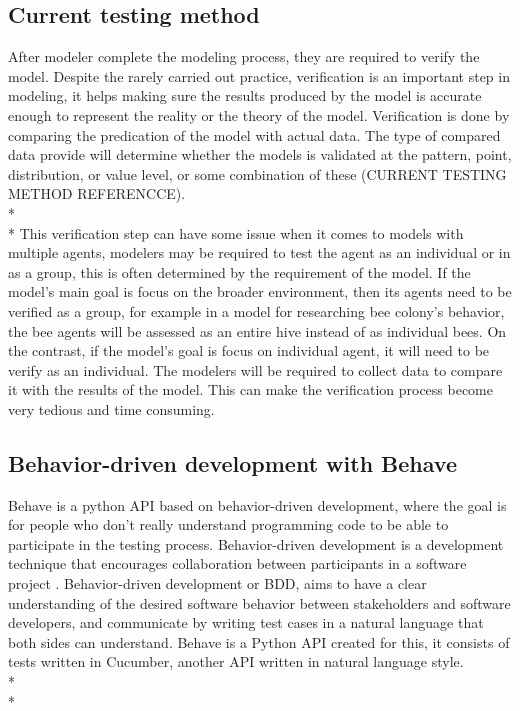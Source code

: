\subsection{Current testing method}
After modeler complete the modeling process, they are required to verify the model. 
Despite the rarely carried out practice, verification is an important step in modeling, it helps making sure the results produced by the model is accurate enough to represent the reality or the theory of the model. Verification is done by comparing the predication of the model with actual data. The type of compared data provide will determine whether the models is validated at the pattern, point, distribution, or value level, or some combination of these (CURRENT TESTING METHOD REFERENCCE). \\*\\*
This verification step can have some issue when it comes to models with multiple agents, modelers may be required to test the agent as an individual or in as a group, this is often determined by the requirement of the model. If the model’s main goal is focus on the broader environment, then its agents need to be verified as a group, for example in a model for researching bee colony’s behavior, the bee agents will be assessed as an entire hive instead of as individual bees. On the contrast, if the model’s goal is focus on individual agent, it will need to be verify as an individual.
The modelers will be required to collect data to compare it with the results of the model. This can make the verification process become very tedious and time consuming. 


\subsection{Behavior-driven development with Behave}
Behave is a python API based on behavior-driven development, where the goal is for people who don’t really understand programming code to be able to participate in the testing process. Behavior-driven development is a development technique that encourages collaboration between participants in a software project \cite{Reference8}. Behavior-driven development or BDD, aims to have a clear understanding of the desired software behavior between stakeholders and software developers, and communicate by writing test cases in a natural language that both sides can understand. Behave is a Python API created for this, it consists of tests written in Cucumber, another API written in natural language style. \\*\\*

